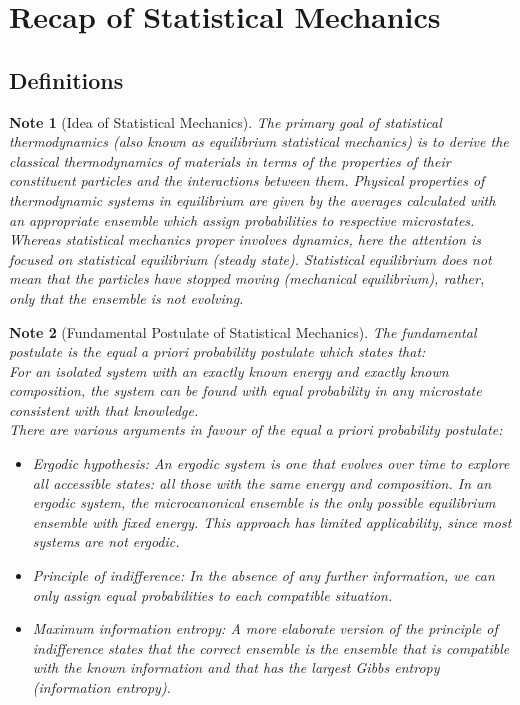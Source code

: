\documentclass[a4paper]{article}
\newtheorem{Note}{Note}[section]
\theoremstyle{new}
\begin{document}
\section{Recap of Statistical Mechanics}
\subsection{Definitions}
\begin{Note}[Idea of Statistical Mechanics]
The primary goal of statistical thermodynamics (also known as equilibrium statistical mechanics) is to derive the classical thermodynamics of materials in terms of the properties of their constituent particles and the interactions between them. Physical properties of thermodynamic systems in equilibrium are given by the averages calculated with an appropriate ensemble which assign probabilities to respective microstates. Whereas statistical mechanics proper involves dynamics, here the attention is focused on statistical equilibrium (steady state). Statistical equilibrium does not mean that the particles have stopped moving (mechanical equilibrium), rather, only that the ensemble is not evolving.
\end{Note}
\begin{Note}[Fundamental Postulate of Statistical Mechanics]
The fundamental postulate is the \emph{equal a priori probability postulate} which states that:\\[5pt]
\emph{For an isolated system with an exactly known energy and exactly known composition, the system can be found with equal probability in any microstate consistent with that knowledge.}\\[5pt]
There are various arguments in favour of the equal a priori probability postulate:
\begin{itemize}
    \item Ergodic hypothesis: An ergodic system is one that evolves over time to explore all accessible states: all those with the same energy and composition. In an ergodic system, the microcanonical ensemble is the only possible equilibrium ensemble with fixed energy. This approach has limited applicability, since most systems are not ergodic.
    \item Principle of indifference: In the absence of any further information, we can only assign equal probabilities to each compatible situation.
    \item Maximum information entropy: A more elaborate version of the principle of indifference states that the correct ensemble is the ensemble that is compatible with the known information and that has the largest Gibbs entropy (information entropy).
\end{itemize}
\end{Note}
\end{document}
